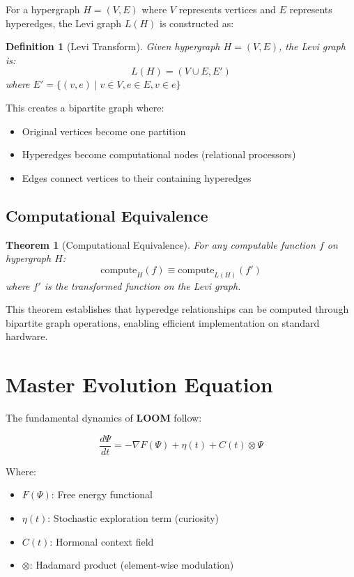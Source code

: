 \documentclass[12pt,a4paper,openany]{book} %
\newcommand{\loom}{\textbf{LOOM}}
\newtheorem{definition}{Definition}[chapter]
\newtheorem{theorem}{Theorem}[chapter]
\begin{document}
For a hypergraph $H = (V, E)$ where $V$ represents vertices and $E$ represents hyperedges, the Levi graph $L(H)$ is constructed as:

\begin{definition}[Levi Transform]
Given hypergraph $H = (V, E)$, the Levi graph is:
\begin{equation}
L(H) = (V \cup E, E')
\end{equation}
where $E' = \{(v, e) \mid v \in V, e \in E, v \in e\}$
\end{definition}

This creates a bipartite graph where:
\begin{itemize}
    \item Original vertices become one partition
    \item Hyperedges become computational nodes (relational processors)
    \item Edges connect vertices to their containing hyperedges
\end{itemize}

\subsection{Computational Equivalence}

\begin{theorem}[Computational Equivalence]
For any computable function $f$ on hypergraph $H$:
\begin{equation}
\text{compute}_H(f) \equiv \text{compute}_{L(H)}(f')
\end{equation}
where $f'$ is the transformed function on the Levi graph.
\end{theorem}

This theorem establishes that hyperedge relationships can be computed through bipartite graph operations, enabling efficient implementation on standard hardware.

\section{Master Evolution Equation}

The fundamental dynamics of \loom{} follow:

\begin{equation}
\frac{d\Psi}{dt} = -\nabla F(\Psi) + \eta(t) + C(t) \otimes \Psi
\end{equation}

Where:
\begin{itemize}
    \item $F(\Psi)$: Free energy functional
    \item $\eta(t)$: Stochastic exploration term (curiosity)
    \item $C(t)$: Hormonal context field
    \item $\otimes$: Hadamard product (element-wise modulation)
\end{itemize}
\end{document}
